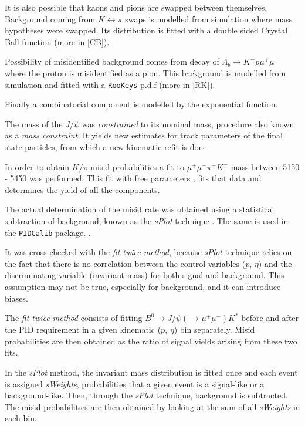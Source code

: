It is also possible that kaons and pions are swapped between themselves. Background coming from $K \leftrightarrow \pi$ swaps is modelled from simulation where mass hypotheses were swapped. Its distribution is fitted with a double sided Crystal Ball function \cite{Skwarnicki:1986xj} (more in \autoref{CB}).

Possibility of misidentified background comes from decay of $\Lambda_{b} \rightarrow K^{-} p \mu^{+} \mu^{-}$ where the proton is misidentified as a pion. This background is modelled from simulation and fitted with a \texttt{RooKeys} p.d.f (more in \autoref{RK}).

Finally a combinatorial component is modelled by the exponential function.


The mass of the $J/\psi$ was \textit{constrained} to its nominal mass, procedure also known as a \textit{mass constraint}. It yields new estimates for track parameters of the final state particles, from which a new kinematic refit is done.

In order to obtain $K/\pi$ misid probabilities a fit to $\mu^{+} \mu^{-} \pi^{+} K^{-}$ mass between 5150 - 5450 \mevcc was performed. This fit with free parameters , fits that data and determines the yield of all the components. 


The actual determination of the misid rate was obtained using a statistical subtraction of background, known as the \textit{sPlot} technique . The same is used in the \texttt{PIDCalib} package. . 

It was cross-checked with the \textit{fit twice method}, because \textit{sPlot} technique relies on the fact that there is no correlation between the control variables ($p$, $\eta$) and the discriminating variable (invariant mass) for both signal and background. This assumption may not be true, especially for background, and it can introduce biases.

The \textit{fit twice method} consists of fitting $B^{0} \rightarrow J/\psi(\rightarrow \mu^{+} \mu^{-}) K^{*}$ before and after the \gls{PID} requirement in a given kinematic ($p$, $\eta$) bin separately. Misid probabilities are then obtained as the ratio of signal yields arising from these two fits.

In the \textit{sPlot} method, the invariant mass distribution is fitted once and each event is assigned \textit{sWeights}, probabilities that a given event is a signal-like or a background-like. Then, through the \textit{sPlot} technique, background is subtracted. The misid probabilities are then obtained by looking at the sum of all \textit{sWeights} in each bin.

